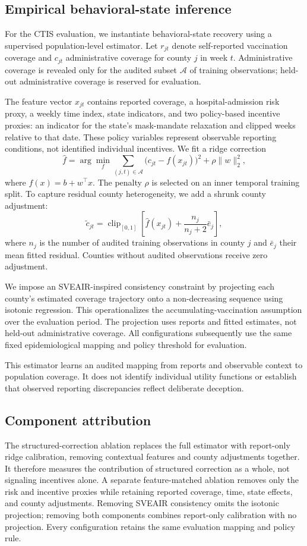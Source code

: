 \documentclass[sigconf,review]{acmart}
\begin{document}
\subsection{Empirical behavioral-state inference}
\label{sec:empirical-inference}

For the CTIS evaluation, we instantiate behavioral-state recovery
using a supervised population-level estimator. Let $r_{jt}$ denote
self-reported vaccination coverage and $c_{jt}$ administrative
coverage for county $j$ in week $t$. Administrative coverage is
revealed only for the audited subset $\mathcal{A}$ of training
observations; held-out administrative coverage is reserved for
evaluation.

The feature vector $x_{jt}$ contains reported coverage, a
hospital-admission risk proxy, a weekly time index, state indicators,
and two policy-based incentive proxies: an indicator for the
state's mask-mandate relaxation and clipped weeks relative to that
date. These policy variables represent observable reporting
conditions, not identified individual incentives.
We fit a ridge correction
\[
\hat f
=\arg\min_f
\sum_{(j,t)\in\mathcal{A}}
\bigl(c_{jt}-f(x_{jt})\bigr)^2
+\rho\|w\|_2^2,
\]
where $f(x)=b+w^\top x$. The penalty $\rho$ is selected on an
inner temporal training split. To capture residual county
heterogeneity, we add a shrunk county adjustment:
\[
\tilde c_{jt}
=\operatorname{clip}_{[0,1]}
\left[
\hat f(x_{jt})
+\frac{n_j}{n_j+2}\bar e_j
\right],
\]
where $n_j$ is the number of audited training observations in county $j$ and $\bar e_j$ their mean fitted residual. Counties without audited observations receive zero adjustment.

We impose an SVEAIR-inspired consistency constraint by projecting each county's estimated coverage trajectory onto a non-decreasing sequence using isotonic regression. This operationalizes the accumulating-vaccination assumption over the evaluation period. The projection uses reports and fitted estimates, not held-out administrative coverage. All configurations subsequently use the same fixed epidemiological mapping and policy threshold for evaluation.

This estimator learns an audited mapping from reports and observable context to population coverage. It does not identify individual utility functions or establish that observed reporting discrepancies reflect deliberate deception.

\subsection{Component attribution} 
The structured-correction ablation replaces the full estimator with report-only ridge calibration, removing contextual features and county adjustments together. It therefore measures the contribution of structured correction as a whole, not signaling incentives alone. A separate feature-matched ablation removes only the risk and incentive proxies while retaining reported coverage, time, state effects, and county adjustments. Removing SVEAIR consistency omits the isotonic projection; removing both components combines report-only calibration with no projection. Every configuration retains the same evaluation mapping and policy rule.
\end{document}
